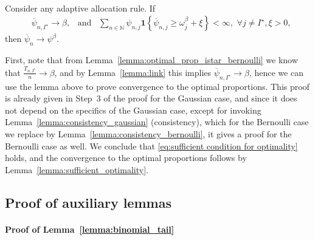 \begin{lemma}\ \\
	Consider any adaptive allocation rule. If 
		\begin{align}
		&\overline{\psi}_{n, I^\star} \rightarrow \beta, \,\,\, \text{ and } \,\,\,
		\sum_{n \in \mathbb{N}} \psi_{n,j} \bm{1} \left\lbrace \overline{\psi}_{n,j} \geq \omega_j^\beta + \xi \right\rbrace < \infty, \,\, \forall j \neq I^\star, \xi > 0,
		\end{align}
	then $\overline{\psi}_{n} \rightarrow \psi^\beta$.
\end{lemma}

First, note that from Lemma~\ref{lemma:optimal_prop_istar_bernoulli} we know that $\frac{T_{n,I^\star}}{n} \rightarrow \beta$, and by Lemma~\ref{lemma:link} this implies $\overline{\psi}_{n, I^\star} \rightarrow \beta$, hence we can use the lemma above to prove convergence to the optimal proportions. This proof is already given in Step~3 of the proof for the Gaussian case, and since it does not depend on the specifics of the Gaussian case, except for invoking Lemma~\ref{lemma:consistency_gaussian} (consistency), which for the Bernoulli case we replace by Lemma~\ref{lemma:consistency_bernoulli}, it gives a proof for the Bernoulli case as well. We conclude that \eqref{eq:sufficient condition for optimality} holds, and the convergence to the optimal proportions follows by Lemma~\ref{lemma:sufficient_optimality}.

\subsection{Proof of auxiliary lemmas}\label{app:posterior_beta.aux}

\paragraph{Proof of Lemma~\ref{lemma:binomial_tail}}

